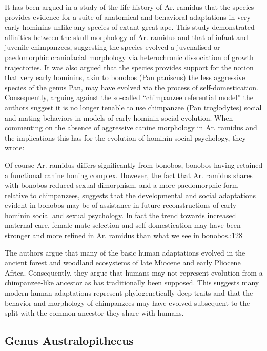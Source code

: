 It has been argued in a study of the life history of Ar. ramidus that the species provides evidence for a suite of anatomical and behavioral adaptations in very early hominins unlike any species of extant great ape. This study demonstrated affinities between the skull morphology of Ar. ramidus and that of infant and juvenile chimpanzees, suggesting the species evolved a juvenalised or paedomorphic craniofacial morphology via heterochronic dissociation of growth trajectories. It was also argued that the species provides support for the notion that very early hominins, akin to bonobos (Pan paniscus) the less aggressive species of the genus Pan, may have evolved via the process of self-domestication. Consequently, arguing against the so-called ``chimpanzee referential model'' the authors suggest it is no longer tenable to use chimpanzee (Pan troglodytes) social and mating behaviors in models of early hominin social evolution. When commenting on the absence of aggressive canine morphology in Ar. ramidus and the implications this has for the evolution of hominin social psychology, they wrote:

Of course Ar. ramidus differs significantly from bonobos, bonobos having retained a functional canine honing complex. However, the fact that Ar. ramidus shares with bonobos reduced sexual dimorphism, and a more paedomorphic form relative to chimpanzees, suggests that the developmental and social adaptations evident in bonobos may be of assistance in future reconstructions of early hominin social and sexual psychology. In fact the trend towards increased maternal care, female mate selection and self-domestication may have been stronger and more refined in Ar. ramidus than what we see in bonobos.:128

The authors argue that many of the basic human adaptations evolved in the ancient forest and woodland ecosystems of late Miocene and early Pliocene Africa. Consequently, they argue that humans may not represent evolution from a chimpanzee-like ancestor as has traditionally been supposed. This suggests many modern human adaptations represent phylogenetically deep traits and that the behavior and morphology of chimpanzees may have evolved subsequent to the split with the common ancestor they share with humans.

\hypertarget{genus-australopithecus}{%
\subsection{Genus Australopithecus}\label{genus-australopithecus}}

